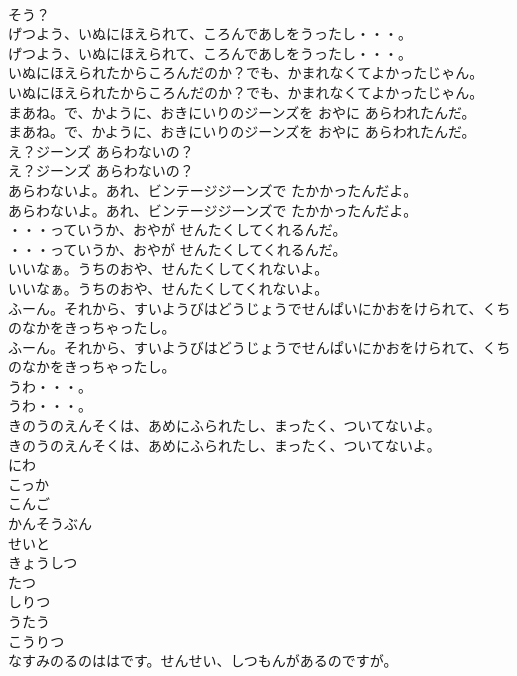 \documentclass[8pt]{extreport}
\begin{document}
\begin{CJK}{UTF8}{min}
\\	そう？
\\	げつよう、いぬにほえられて、ころんであしをうったし・・・。
\\	げつよう、いぬにほえられて、ころんであしをうったし・・・。
\\	いぬにほえられたからころんだのか？でも、かまれなくてよかったじゃん。
\\	いぬにほえられたからころんだのか？でも、かまれなくてよかったじゃん。
\\	まあね。で、かように、おきにいりのジーンズを おやに あらわれたんだ。
\\	まあね。で、かように、おきにいりのジーンズを おやに あらわれたんだ。
\\	え？ジーンズ あらわないの？
\\	え？ジーンズ あらわないの？
\\	あらわないよ。あれ、ビンテージジーンズで たかかったんだよ。
\\	あらわないよ。あれ、ビンテージジーンズで たかかったんだよ。
\\	・・・っていうか、おやが せんたくしてくれるんだ。
\\	・・・っていうか、おやが せんたくしてくれるんだ。
\\	いいなぁ。うちのおや、せんたくしてくれないよ。
\\	いいなぁ。うちのおや、せんたくしてくれないよ。
\\	ふーん。それから、すいようびはどうじょうでせんぱいにかおをけられて、くちのなかをきっちゃったし。
\\	ふーん。それから、すいようびはどうじょうでせんぱいにかおをけられて、くちのなかをきっちゃったし。
\\	うわ・・・。
\\	うわ・・・。
\\	きのうのえんそくは、あめにふられたし、まったく、ついてないよ。
\\	きのうのえんそくは、あめにふられたし、まったく、ついてないよ。
\\	にわ
\\	こっか
\\	こんご
\\	かんそうぶん
\\	せいと
\\	きょうしつ
\\	たつ
\\	しりつ
\\	うたう
\\	こうりつ
\\	なすみのるのははです。せんせい、しつもんがあるのですが。

\end{CJK}
\end{document}
